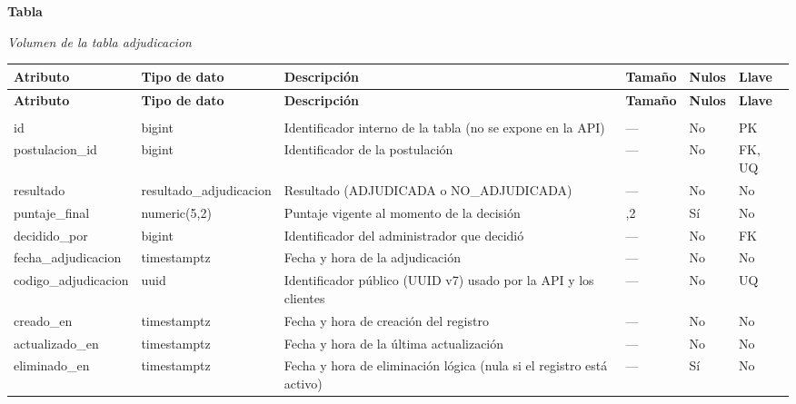 \label{tab:volumen_adjudicacion}
\noindent\textbf{Tabla~\thetable}\par\nopagebreak
\noindent\textit{Volumen de la tabla adjudicacion}\par\nopagebreak
\begingroup\small\linespread{1}\selectfont\setlength{\tabcolsep}{4pt}
\begin{longtable}{>{\raggedright\arraybackslash}p{3.4cm} >{\raggedright\arraybackslash}p{2.5cm} >{\raggedright\arraybackslash}p{4.8cm} >{\centering\arraybackslash}p{1.6cm}>{\centering\arraybackslash}p{1.1cm} >{\centering\arraybackslash}p{1.3cm}}
\toprule
\textbf{Atributo} & \textbf{Tipo de dato} & \textbf{Descripción} & \textbf{Tamaño} & \textbf{Nulos} & \textbf{Llave} \\
\midrule
\endfirsthead
\toprule
\textbf{Atributo} & \textbf{Tipo de dato} & \textbf{Descripción} & \textbf{Tamaño} & \textbf{Nulos} & \textbf{Llave} \\
\midrule
\endhead
\endfoot
\bottomrule
\multicolumn{6}{l}{\textit{Nota.} Elaboración propia.} \\
\endlastfoot
id & bigint & Identificador interno de la tabla (no se expone en la API) & — & No & PK \\
postulacion\_\allowbreak{}id & bigint & Identificador de la postulación & — & No & FK, UQ \\
resultado & resultado\_\allowbreak{}adjudicacion & Resultado (ADJUDICADA o NO\_\allowbreak{}ADJUDICADA) & — & No & No \\
puntaje\_\allowbreak{}final & numeric(5,2) & Puntaje vigente al momento de la decisión & 5,2 & Sí & No \\
decidido\_\allowbreak{}por & bigint & Identificador del administrador que decidió & — & No & FK \\
fecha\_\allowbreak{}adjudicacion & timestamptz & Fecha y hora de la adjudicación & — & No & No \\
codigo\_\allowbreak{}adjudicacion & uuid & Identificador público (UUID v7) usado por la API y los clientes & — & No & UQ \\
creado\_\allowbreak{}en & timestamptz & Fecha y hora de creación del registro & — & No & No \\
actualizado\_\allowbreak{}en & timestamptz & Fecha y hora de la última actualización & — & No & No \\
eliminado\_\allowbreak{}en & timestamptz & Fecha y hora de eliminación lógica (nula si el registro está activo) & — & Sí & No \\
\end{longtable}
\endgroup
\addtocounter{table}{-1}

